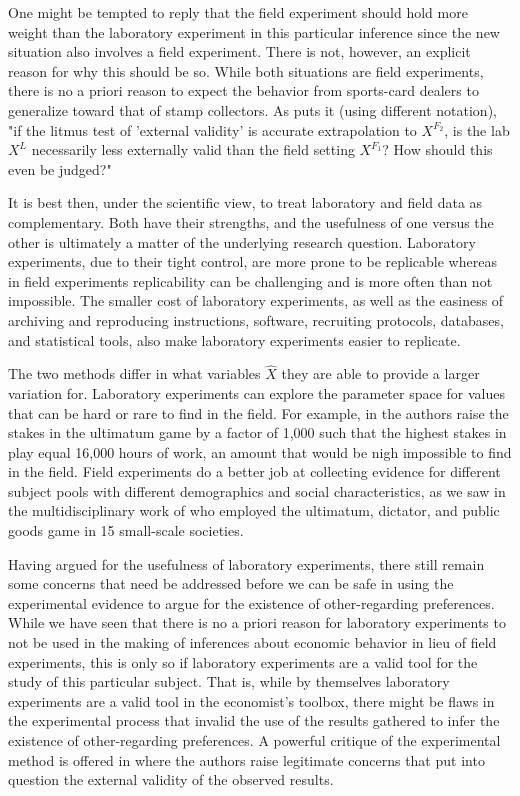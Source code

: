 \documentclass[12pt]{article}
\begin{document}
One might be tempted to reply that the field experiment should hold more weight than the laboratory experiment in this particular inference since the new situation also involves a field experiment. There is not, however, an explicit reason for why this should be so. While both situations are field experiments, there is no a priori reason to expect the behavior from sports-card dealers to generalize toward that of stamp collectors. As \cite{camerer2011promise} puts it (using different notation), "if the litmus test of 'external validity' is accurate extrapolation to $X^{F_2}$, is the lab $X^L$ necessarily less externally valid than the field setting $X^{F_1}$? How should this even be judged?"

It is best then, under the scientific view, to treat laboratory and field data as complementary. Both have their strengths, and the usefulness of one versus the other is ultimately a matter of the underlying research question. Laboratory experiments, due to their tight control, are more prone to be replicable whereas in field experiments replicability can be challenging and is more often than not impossible. The smaller cost of laboratory experiments, as well as the easiness of archiving and reproducing instructions, software, recruiting protocols, databases, and statistical tools, also make laboratory experiments easier to replicate. 

The two methods differ in what variables $\hat{X}$ they are able to provide a larger variation for. Laboratory experiments can explore the parameter space for values that can be hard or rare to find in the field. For example, in \cite{andersen2011stakes} the authors raise the stakes in the ultimatum game by a factor of 1,000 such that the highest stakes in play equal 16,000 hours of work, an amount that would be nigh impossible to find in the field. Field experiments do a better job at collecting evidence for different subject pools with different demographics and social characteristics, as we saw in the multidisciplinary work of \cite{henrich2005economic} who employed the ultimatum, dictator, and public goods game in 15 small-scale societies. 

Having argued for the usefulness of laboratory experiments, there still remain some concerns that need be addressed before we can be safe in using the experimental evidence to argue for the existence of other-regarding preferences. While we have seen that there is no a priori reason for laboratory experiments to not be used in the making of inferences about economic behavior in lieu of field experiments, this is only so if laboratory experiments are a valid tool for the study of this particular subject. That is, while by themselves laboratory experiments are a valid tool in the economist's toolbox, there might be flaws in the experimental process that invalid the use of the results gathered to infer the existence of other-regarding preferences. A powerful critique of the experimental method is offered in \cite{levitt2007laboratory} where the authors raise legitimate concerns that put into question the external validity of the observed results.
\end{document}
